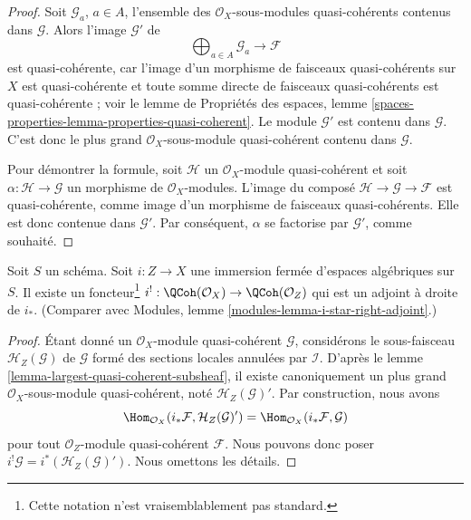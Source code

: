 \begin{proof}
Soit $\mathcal{G}_a$, $a \in A$, l'ensemble des
$\mathcal{O}_X$-sous-modules quasi-cohérents contenus dans $\mathcal{G}$.
Alors l'image $\mathcal{G}'$ de
$$
\bigoplus\nolimits_{a \in A} \mathcal{G}_a \longrightarrow \mathcal{F}
$$
est quasi-cohérente, car l'image d'un morphisme de faisceaux quasi-cohérents
sur $X$ est quasi-cohérente et toute somme directe de faisceaux quasi-cohérents
est quasi-cohérente ; voir le lemme de
Propriétés des espaces,
lemme \ref{spaces-properties-lemma-properties-quasi-coherent}.
Le module $\mathcal{G}'$ est contenu dans $\mathcal{G}$. C'est donc le
plus grand $\mathcal{O}_X$-sous-module quasi-cohérent contenu dans $\mathcal{G}$.

\medskip\noindent
Pour démontrer la formule, soit $\mathcal{H}$ un
$\mathcal{O}_X$-module quasi-cohérent et soit $\alpha : \mathcal{H} \to \mathcal{G}$
un morphisme de $\mathcal{O}_X$-modules. L'image du composé
$\mathcal{H} \to \mathcal{G} \to \mathcal{F}$ est quasi-cohérente,
comme image d'un morphisme de faisceaux quasi-cohérents. Elle est donc contenue
dans $\mathcal{G}'$. Par conséquent, $\alpha$ se factorise par $\mathcal{G}'$,
comme souhaité.
\end{proof}

\begin{lemma}
\label{lemma-i-upper-shriek}
Soit $S$ un schéma.
Soit $i : Z \to X$ une immersion fermée d'espaces algébriques sur $S$.
Il existe un foncteur\footnote{Cette notation n'est vraisemblablement pas standard.}
$i^! : \QCoh(\mathcal{O}_X) \to \QCoh(\mathcal{O}_Z)$
qui est un adjoint à droite de $i_*$. (Comparer avec
Modules, lemme \ref{modules-lemma-i-star-right-adjoint}.)
\end{lemma}

\begin{proof}
Étant donné un $\mathcal{O}_X$-module quasi-cohérent $\mathcal{G}$, considérons
le sous-faisceau $\mathcal{H}_Z(\mathcal{G})$ de $\mathcal{G}$ formé des sections locales
annulées par $\mathcal{I}$. D'après le
lemme \ref{lemma-largest-quasi-coherent-subsheaf},
il existe canoniquement un plus grand $\mathcal{O}_X$-sous-module quasi-cohérent,
noté $\mathcal{H}_Z(\mathcal{G})'$. Par construction, nous avons
$$
\Hom_{\mathcal{O}_X}(i_*\mathcal{F}, \mathcal{H}_Z(\mathcal{G})')
=
\Hom_{\mathcal{O}_X}(i_*\mathcal{F}, \mathcal{G})
$$
pour tout $\mathcal{O}_Z$-module quasi-cohérent $\mathcal{F}$.
Nous pouvons donc poser $i^!\mathcal{G} = i^*(\mathcal{H}_Z(\mathcal{G})')$.
Nous omettons les détails.
\end{proof}

